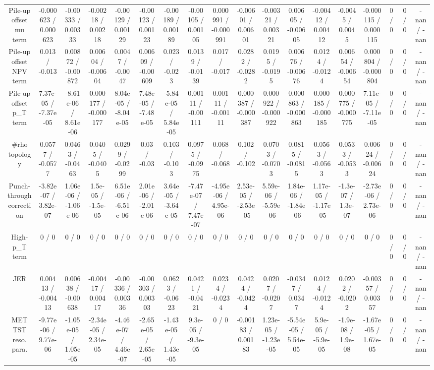 \documentclass[10pt]{article}
\begin{document}
\begin{table}[htbp]
\begin{center}
\begin{tabular}{|c|c|c|c|c|c|c|c|c|c|c|c|c|c|c|c|c|c|}
  Pile-up offset mu term & -0.000623 / 0.000623 & -0.00333 / 0.00333 & -0.00218 / 0.00218 & -0.00129 / 0.00129 & -0.00123 / 0.00123 & -0.00189 / 0.00189 & -0.00105 / 0.00105 & 0.000991 / -0.000991 & -0.00601 / 0.00601 & -0.00321 / 0.00321 & 0.00605 / -0.00605 & -0.00412 / 0.00412 & -0.0045 / 0.0045 & -0.000115 / 0.000115 & 0 / 0 & 0 / 0 & -nan / -nan \\ 
  Pile-up offset NPV term & 0.013 / -0.013 & 0.00872 / -0.00872 & 0.00604 / -0.00604 & 0.0047 / -0.0047 & 0.00609 / -0.00609 & 0.023 / -0.023 & 0.0139 / -0.0139 & 0.017 / -0.017 & 0.0282 / -0.0282 & 0.0195 / -0.0195 & 0.00676 / -0.00676 & 0.0124 / -0.0124 & 0.00654 / -0.00654 & 0.000804 / -0.000804 & 0 / 0 & 0 / 0 & -nan / -nan \\ 
  Pile-up offset p_{T} term & 7.37e-05 / -7.37e-05 & -8.61e-06 / 8.61e-06 & 0.000177 / -0.000177 & 8.04e-05 / -8.04e-05 & 7.48e-05 / -7.48e-05 & -5.84e-05 / 5.84e-05 & 0.00111 / -0.00111 & 0.00111 / -0.00111 & 0.000387 / -0.000387 & 0.000922 / -0.000922 & 0.000863 / -0.000863 & 0.000185 / -0.000185 & 0.000775 / -0.000775 & 7.11e-05 / -7.11e-05 & 0 / 0 & 0 / 0 & -nan / -nan \\ 
  #rho topology & 0.0577 / -0.0577 & 0.0463 / -0.0463 & 0.0405 / -0.0405 & 0.0299 / -0.0299 & 0.03 / -0.03 & 0.103 / -0.103 & 0.0975 / -0.0975 & 0.068 / -0.068 & 0.102 / -0.102 & 0.0703 / -0.0703 & 0.0815 / -0.0815 & 0.0563 / -0.0563 & 0.0533 / -0.0533 & 0.00624 / -0.00624 & 0 / 0 & 0 / 0 & -nan / -nan \\ 
  Punch-through correction & -3.82e-07 / 3.82e-07 & 1.06e-06 / -1.06e-06 & 1.5e-05 / -1.5e-05 & 6.51e-06 / -6.51e-06 & 2.01e-06 / -2.01e-06 & 3.64e-05 / -3.64e-05 & -7.47e-07 / 7.47e-07 & -4.95e-06 / 4.95e-06 & 2.53e-05 / -2.53e-05 & 5.59e-06 / -5.59e-06 & 1.84e-06 / -1.84e-06 & 1.17e-05 / -1.17e-05 & -1.3e-07 / 1.3e-07 & -2.73e-06 / 2.73e-06 & 0 / 0 & 0 / 0 & -nan / -nan \\ 
  High-p_{T} term & 0 / 0 & 0 / 0 & 0 / 0 & 0 / 0 & 0 / 0 & 0 / 0 & 0 / 0 & 0 / 0 & 0 / 0 & 0 / 0 & 0 / 0 & 0 / 0 & 0 / 0 & 0 / 0 & 0 / 0 & 0 / 0 & -nan / -nan \\ 
  JER & 0.00413 / -0.00413 & 0.00638 / -0.00638 & -0.00417 / 0.00417 & -0.00336 / 0.00336 & -0.00303 / 0.00303 & 0.0623 / -0.0623 & 0.0421 / -0.0421 & 0.0234 / -0.0234 & 0.0424 / -0.0424 & 0.0207 / -0.0207 & -0.0347 / 0.0347 & 0.0124 / -0.0124 & 0.0202 / -0.0202 & -0.00357 / 0.00357 & 0 / 0 & 0 / 0 & -nan / -nan \\ 
  MET TST reso. para. & -9.77e-06 / 9.77e-06 & -1.05e-05 / 1.05e-05 & -2.34e-05 / 2.34e-05 & -4.46e-07 / 4.46e-07 & -2.65e-05 / 2.65e-05 & -1.43e-05 / 1.43e-05 & 9.3e-05 / -9.3e-05 & 0 / 0 & -0.00183 / 0.00183 & 1.23e-05 / -1.23e-05 & -5.54e-05 / 5.54e-05 & 5.9e-05 / -5.9e-05 & -1.9e-08 / 1.9e-08 & -1.67e-05 / 1.67e-05 & 0 / 0 & 0 / 0 & -nan / -nan \\ 

\end{tabular}
\end{center}
\end{table}
\end{document}
